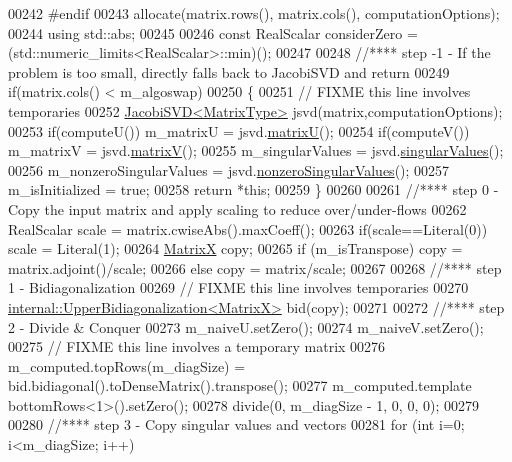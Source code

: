 \begin{DoxyCode}
00242 \textcolor{preprocessor}{#endif}
00243   allocate(matrix.rows(), matrix.cols(), computationOptions);
00244   \textcolor{keyword}{using} std::abs;
00245 
00246   \textcolor{keyword}{const} RealScalar considerZero = (std::numeric\_limits<RealScalar>::min)();
00247   
00248   \textcolor{comment}{//**** step -1 - If the problem is too small, directly falls back to JacobiSVD and return}
00249   \textcolor{keywordflow}{if}(matrix.cols() < m\_algoswap)
00250   \{
00251     \textcolor{comment}{// FIXME this line involves temporaries}
00252     \hyperlink{group___s_v_d___module_class_eigen_1_1_jacobi_s_v_d}{JacobiSVD<MatrixType>} jsvd(matrix,computationOptions);
00253     \textcolor{keywordflow}{if}(computeU()) m\_matrixU = jsvd.\hyperlink{group___s_v_d___module_afc7fe1546b0f6e1801b86f22f5664cb8}{matrixU}();
00254     \textcolor{keywordflow}{if}(computeV()) m\_matrixV = jsvd.\hyperlink{group___s_v_d___module_a245a453b5e7347f737295c23133238c4}{matrixV}();
00255     m\_singularValues = jsvd.\hyperlink{group___s_v_d___module_a4e7bac123570c348f7ed6be909e1e474}{singularValues}();
00256     m\_nonzeroSingularValues = jsvd.\hyperlink{group___s_v_d___module_afe8a555f38393a319a71ec0f0331c9ef}{nonzeroSingularValues}();
00257     m\_isInitialized = \textcolor{keyword}{true};
00258     \textcolor{keywordflow}{return} *\textcolor{keyword}{this};
00259   \}
00260   
00261   \textcolor{comment}{//**** step 0 - Copy the input matrix and apply scaling to reduce over/under-flows}
00262   RealScalar scale = matrix.cwiseAbs().maxCoeff();
00263   \textcolor{keywordflow}{if}(scale==Literal(0)) scale = Literal(1);
00264   \hyperlink{group___core___module_class_eigen_1_1_matrix}{MatrixX} copy;
00265   \textcolor{keywordflow}{if} (m\_isTranspose) copy = matrix.adjoint()/scale;
00266   \textcolor{keywordflow}{else}               copy = matrix/scale;
00267   
00268   \textcolor{comment}{//**** step 1 - Bidiagonalization}
00269   \textcolor{comment}{// FIXME this line involves temporaries}
00270   \hyperlink{class_eigen_1_1internal_1_1_upper_bidiagonalization}{internal::UpperBidiagonalization<MatrixX>} bid(copy);
00271 
00272   \textcolor{comment}{//**** step 2 - Divide & Conquer}
00273   m\_naiveU.setZero();
00274   m\_naiveV.setZero();
00275   \textcolor{comment}{// FIXME this line involves a temporary matrix}
00276   m\_computed.topRows(m\_diagSize) = bid.bidiagonal().toDenseMatrix().transpose();
00277   m\_computed.template bottomRows<1>().setZero();
00278   divide(0, m\_diagSize - 1, 0, 0, 0);
00279 
00280   \textcolor{comment}{//**** step 3 - Copy singular values and vectors}
00281   \textcolor{keywordflow}{for} (\textcolor{keywordtype}{int} i=0; i<m\_diagSize; i++)

\end{DoxyCode}

